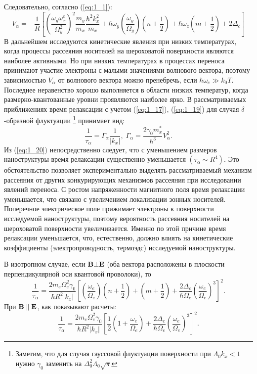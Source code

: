 Следовательно, согласно (\ref{eq:1_1}):
\begin{equation}
\label{eq:1_19}
V_{\alpha }=-\frac{1}{R}\left[{\left(\frac{{\omega }_y{\omega }^c_x}{{\Omega }^2_y}\right)}^2\frac{m_y}{m_x}\frac{{\hbar }^2k^2_x}{m_x}+\hbar {\omega }_y\left(\frac{{\omega }_y}{{\Omega }_y}\right)\left(n+\frac{1}{2}\right)+\hbar {\omega }_z\left(m+\frac{1}{2}\right)+2{\Delta }_c\right]
\end{equation}
В дальнейшем исследуются кинетические явления при низких температурах, когда процессы рассеяния носителей на шероховатой поверхности являются наиболее активными. Но при низких температурах в процессах переноса принимают участие электроны с малыми значениями волнового вектора, поэтому зависимостью $V_\alpha$ от волнового вектора можно пренебречь, если $\hbar\omega_e \gg k_0 T$. Последнее неравенство хорошо выполняется в области низких температур, когда размерно-квантованные уровни проявляются наиболее ярко. В рассматриваемых приближениях время релаксации с учетом (\ref{eq:1_17}), (\ref{eq:1_19}) для случая $\delta$-образной флуктуации \footnote{Заметим, что для случая гауссовой флуктуации поверхности при $\Lambda_0 k_x<1$ нужно $\gamma_0$ заменить на $\Delta_0^2 \Lambda_0 \sqrt{\pi}$} принимает вид:
\begin{equation}
\label{eq:1_20}
\frac{1}{{\tau }_{\alpha }}={\Gamma }_{\alpha }\frac{1}{\left|k_x\right|},\;
\Gamma_{\alpha }=\frac{2\gamma_0 m^*_x}{\hbar^3} V^2_{\alpha}.
\end{equation}
Из (\ref{eq:1_20}) непосредственно следует, что с уменьшением размеров наноструктуры время релаксации существенно уменьшается $\left(\tau_\alpha \sim R^4 \right)$. Это обстоятельство позволяет экспериментально выделять рассматриваемый механизм рассеяния \cite{Sakaki1987} от других конкурирующих механизмов рассеяния при исследовании явлений переноса. С ростом напряженности магнитного поля время релаксации уменьшается, что связано с увеличением локализации зонных носителей. Поперечное электрическое поле прижимает электроны к поверхности исследуемой наноструктуры, поэтому вероятность рассеяния носителей на шероховатой поверхности увеличивается. Именно по этой причине время релаксации уменьшается, что, естественно, должно влиять на кинетические коэффициенты (электропроводность, термоэдс) исследуемой наноструктуры.

В изотропном случае, если $\boldsymbol{\mathbf{B}}\bot\boldsymbol{\mathbf{E}}$ (оба вектора расположены в плоскости перпендикулярной оси квантовой проволоки), то
\begin{equation}
\label{eq:1_20_10}
\frac{1}{\tau_\alpha}=\frac{2m_e\Omega^2_e \gamma_0}{\hbar R^2 \left|k_x\right|} \left[\left(\frac{\omega_e}{\Omega_e}\right) \left(n+\frac{1}{2}\right)+ \left(m+\frac{1}{2}\right)+ \frac{2\Delta_c}{\hbar\Omega_e} \left(\frac{\omega_e}{\Omega_e}\right)^3\right]^2.
\end{equation}
При $\boldsymbol{\mathbf{B}} \parallel \boldsymbol{\mathbf{E}}$, как показывают расчеты:
\begin{equation}
\label{eq:1_20_20}
\frac{1}{\tau_\alpha}=\frac{2m_e\Omega^2_e \gamma_0}{\hbar R^2 \left|k_x\right|} \left[\frac{1}{2}\left(1+\frac{\omega_e}{\Omega_e}\right) + \frac{2\Delta_c}{\hbar\Omega_e} \left(\frac{\omega_e}{\Omega_e}\right)^3\right]^2.
\end{equation}

